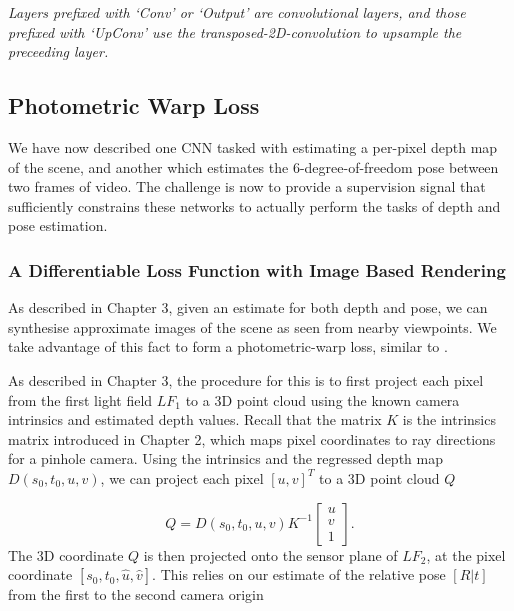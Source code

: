 \begin{table}[h]
    \vspace{4mm}{}
    \textit{Layers prefixed with `Conv' or `Output' are convolutional layers, and those prefixed with `UpConv' use the transposed-2D-convolution to upsample the preceeding layer.}
    
    \label{dispnet-layers}
\end{table}


\subsection{Photometric Warp Loss}
We have now described one CNN tasked with estimating a per-pixel depth map of the scene, and another which estimates the 6-degree-of-freedom pose between two frames of video. The challenge is now to provide a supervision signal that sufficiently constrains these networks to actually perform the tasks of depth and pose estimation. 

\subsubsection{A Differentiable Loss Function with Image Based Rendering}

As described in Chapter 3, given an estimate for both depth and pose, we can synthesise approximate images of the scene as seen from nearby viewpoints. We take advantage of this fact to form a photometric-warp loss, similar to \cite{zhou2017unsupervised}. 

As described in Chapter 3, the procedure for this is to first project each pixel from the first light field $LF_1$ to a 3D point cloud using the known camera intrinsics and estimated depth values. Recall that the matrix $K$ is the intrinsics matrix introduced in Chapter 2, which maps pixel coordinates to ray directions for a pinhole camera. Using the intrinsics and the regressed depth map $D(s_0, t_0, u, v)$, we can project each pixel $[u, v]^T$ to a 3D point cloud $Q$

\begin{equation}
    Q = D(s_0, t_0, u, v) K^{-1}\begin{bmatrix}u \\ v \\ 1\end{bmatrix}.
\end{equation}
 The 3D coordinate $Q$ is then projected onto the sensor plane of $LF_2$, at the pixel coordinate $[s_0,t_0,\hat{u},\hat{v}]$. This relies on our estimate of the relative pose $[R|t]$ from the first to the second camera origin

